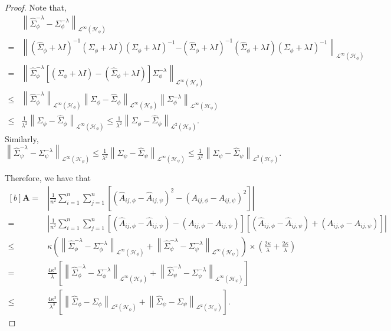 \documentclass{article} %
\newcommand{\HS}{\mathcal{L}^{2}}
\newcommand{\Op}{\mathcal{L}^{\infty}}
\newcommand{\repone}{\phi}
\newcommand{\reptwo}{\psi}
\newcommand{\Hone}{\mathcal{H}_{\phi}}
\newcommand{\Htwo}{\mathcal{H}_{\psi}}
\newcommand{\norm}[1]{\left\|#1\right\|}
\theoremstyle{plain}
\begin{document}
\begin{proof}
Note that,
\[
\begin{aligned}
    &\norm{\hat{\Sigma}_{\repone}^{-\lambda}-\Sigma_{\repone}^{-\lambda}}_{\Op(\Hone)}\\
    =&\left\|\left(\hat{\Sigma}_{\repone}+\lambda I\right)^{-1}\left(\Sigma_{\repone}+\lambda I\right)\left(\Sigma_{\repone}+\lambda I\right)^{-1} \right.\left.- \left(\hat{\Sigma}_{\repone}+\lambda I\right)^{-1}\left(\hat{\Sigma}_{\repone}+\lambda I\right)\left(\Sigma_{\repone}+\lambda I\right)^{-1}\right\|_{\Op(\Hone)}\\
    =&\norm{\hat{\Sigma}_{\repone}^{-\lambda}\left[\left(\Sigma_{\repone}+\lambda I\right)-\left(\hat{\Sigma}_{\repone}+\lambda I\right)\right]\Sigma_{\repone}^{-\lambda}}_{\Op(\Hone)}\\
    \leq& \norm{\hat{\Sigma}_{\repone}^{-\lambda}}_{\Op(\Hone)} \norm{\Sigma_{\repone} - \hat{\Sigma}_{\repone}}_{\Op(\Hone)} \norm{\Sigma_{\repone}^{-\lambda}}_{\Op(\Hone)}\\
    \leq& \frac{1}{\lambda^{2}}\norm{\Sigma_{\repone} - \hat{\Sigma}_{\repone}}_{\Op(\Hone)}
    \leq \frac{1}{\lambda^{2}}\norm{\Sigma_{\repone} - \hat{\Sigma}_{\repone}}_{\HS(\Hone)}.
\end{aligned}
\]
Similarly, $\norm{\hat{\Sigma}_{\reptwo}^{-\lambda}-\Sigma_{\reptwo}^{-\lambda}}_{\Op(\Htwo)}\leq \frac{1}{\lambda^{2}}\norm{\Sigma_{\reptwo} - \hat{\Sigma}_{\reptwo}}_{\Op(\Htwo)}\leq \frac{1}{\lambda^{2}}\norm{\Sigma_{\reptwo} - \hat{\Sigma}_{\reptwo}}_{\HS(\Htwo)}$.

Therefore, we have that 
\begin{equation}\label{Bound on A}
\begin{aligned}[b]
    \mathbf{A}
    =&\left|\frac{1}{n^{2}}\sum_{i=1}^{n}\sum_{j=1}^{n}\left[\left(\hat{A}_{ij,\repone}-\hat{A}_{ij,\reptwo}\right)^{2} - \left(A_{ij,\repone}-A_{ij,\reptwo}\right)^{2}\right]\right|\\
    =& \left|\frac{1}{n^{2}}\sum_{i=1}^{n}\sum_{j=1}^{n}\left[\left(\hat{A}_{ij,\repone}-\hat{A}_{ij,\reptwo}\right) - \left(A_{ij,\repone}-A_{ij,\reptwo}\right)\right]\right.\left.\left[\left(\hat{A}_{ij,\repone}-\hat{A}_{ij,\reptwo}\right) + \left(A_{ij,\repone}-A_{ij,\reptwo}\right)\right]\right|\\
    \leq& \kappa \left(\norm{\hat{\Sigma}_{\repone}^{-\lambda}-\Sigma_{\repone}^{-\lambda}}_{\Op(\Hone)} + \norm{\hat{\Sigma}_{\reptwo}^{-\lambda}-\Sigma_{\reptwo}^{-\lambda}}_{\Op(\Htwo)}\right)\times \left(\frac{2\kappa}{\lambda}+\frac{2\kappa}{\lambda}\right)\\
    =&\frac{4\kappa^{2}}{\lambda}\left[\norm{\hat{\Sigma}_{\repone}^{-\lambda}-\Sigma_{\repone}^{-\lambda}}_{\Op(\Hone)} + \norm{\hat{\Sigma}_{\reptwo}^{-\lambda}-\Sigma_{\reptwo}^{-\lambda}}_{\Op(\Htwo)}\right]\\
    \leq&\frac{4\kappa^{2}}{\lambda^{3}}\left[\norm{\hat{\Sigma}_{\repone}-\Sigma_{\repone}}_{\HS(\Hone)} + \norm{\hat{\Sigma}_{\reptwo}-\Sigma_{\reptwo}}_{\HS(\Htwo)}\right].
\end{aligned}
\end{equation}


\end{proof}
\end{document}
